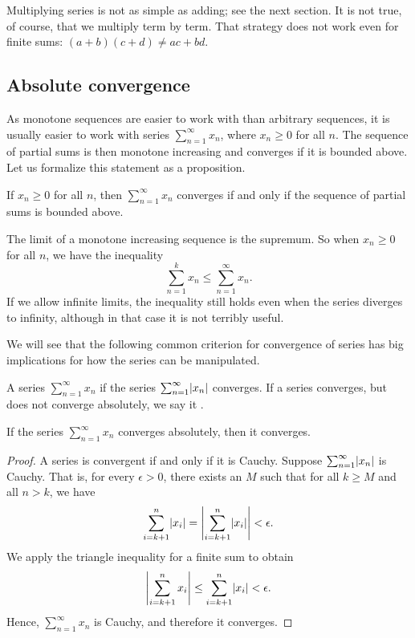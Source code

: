 Multiplying series is not as simple as adding; see the next
section.
It is not true, of course, that we multiply
term by term.  That strategy does not work even for finite sums:
$(a+b)(c+d) \neq ac+bd$.

\subsection{Absolute convergence}

As monotone sequences are easier to work with than arbitrary sequences, it
is usually easier to work with series $\sum_{n=1}^\infty x_n$, where $x_n \geq 0$ for
all $n$.  The sequence of partial sums is then monotone increasing
and converges if it is bounded above.
Let us formalize this statement as a proposition.

\begin{prop}
If $x_n \geq 0$ for all $n$, then $\sum_{n=1}^\infty x_n$ converges if and only if
the sequence of partial sums is bounded above.
\end{prop}

The limit of a monotone increasing sequence is the supremum.
So when $x_n \geq 0$ for all $n$, we have the
inequality
\begin{equation*}
\sum_{n=1}^k x_n \leq
\sum_{n=1}^\infty x_n .
\end{equation*}
If we allow infinite limits, the inequality still
holds even when the series diverges to infinity, although in that case it is not
terribly useful.

We will see that the following common criterion for convergence of series 
has big implications for how the series can be manipulated.

\begin{defn}
A series $\sum_{n=1}^\infty x_n$
\emph{} if
the series $\sum_{n=1}^\infty \lvert {x_n} \rvert$ converges.
If a series converges, but does not converge absolutely, we say
it \emph{}.
\end{defn}

\begin{prop}
If the series $\sum_{n=1}^\infty x_n$ converges absolutely, then it converges.
\end{prop}

\begin{proof}
A series is convergent if and only if it is Cauchy.
Suppose $\sum_{n=1}^\infty \lvert {x_n} \rvert$ is Cauchy.  That is, for every $\epsilon > 0$,
there exists an $M$ such that for all $k \geq M$ and all $n > k$, we have 
\begin{equation*}
\sum_{i=k+1}^n \lvert {x_i} \rvert 
=
\left\lvert { \sum_{i=k+1}^n \lvert {x_i} \rvert } \right\rvert
<
\epsilon .
\end{equation*}
We apply the triangle inequality for a finite sum to obtain
\begin{equation*}
\left\lvert { \sum_{i=k+1}^n x_i } \right\rvert
\leq
\sum_{i=k+1}^n \lvert {x_i} \rvert
<
\epsilon .
\end{equation*}
Hence, $\sum_{n=1}^\infty x_n$ is Cauchy, and therefore it converges.
\end{proof}

